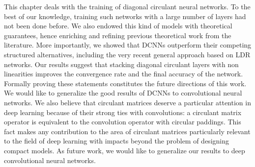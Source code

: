 This chapter deals with the training of diagonal circulant neural networks.
To the best of our knowledge, training such networks with a large number of layers had not been done before.
We also endowed this kind of models with theoretical guarantees, hence enriching and refining previous theoretical work from the literature.
More importantly, we showed that DCNNs outperform their competing structured alternatives, including the very recent general approach based on LDR networks.
Our results suggest that stacking diagonal circulant layers with non linearities improves the convergence rate and the final accuracy of the network.
Formally proving these statements constitutes the future directions of this work.
We would like to generalize the good results of DCNNs to convolutional neural networks.
We also believe that circulant matrices deserve a particular attention in deep learning because of their strong ties with convolutions: a circulant matrix operator is equivalent to the convolution operator with circular paddings.
This fact makes any contribution to the area of circulant matrices particularly relevant to the field of deep learning with impacts beyond the problem of designing compact models.
As future work, we would like to generalize our results to deep convolutional neural networks. 

